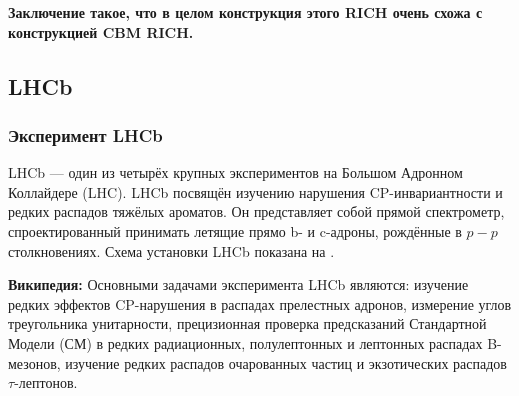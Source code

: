 \textbf{Заключение такое, что в целом конструкция этого RICH очень схожа с конструкцией CBM RICH.}




\subsection{LHCb}\label{sec:LHCb}



\subsubsection{Эксперимент LHCb}

LHCb --- один из четырёх крупных экспериментов на Большом Адронном Коллайдере (LHC). LHCb посвящён изучению нарушения CP-инвариантности и редких распадов тяжёлых ароматов. Он представляет собой прямой спектрометр, спроектированный принимать летящие прямо b- и c-адроны, рождённые в $p-p$ столкновениях. Схема установки LHCb показана на .


\textbf{Википедия:}
Основными задачами эксперимента LHCb являются: изучение редких эффектов CP-нарушения в распадах прелестных адронов, измерение углов треугольника унитарности, прецизионная проверка предсказаний Стандартной Модели (СМ) в редких радиационных, полулептонных и лептонных распадах B-мезонов, изучение редких распадов очарованных частиц и экзотических распадов $\tau$-лептонов.

